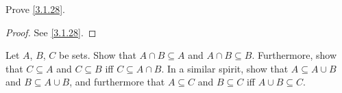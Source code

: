 \begin{ex}\label{ex:3.1.6}
	Prove \cref{3.1.28}.
\end{ex}

\begin{proof}
	See \cref{3.1.28}.
\end{proof}

\begin{ex}\label{ex:3.1.7}
	Let \(A\), \(B\), \(C\) be sets.
	Show that \(A \cap B \subseteq A\) and \(A \cap B \subseteq B\).
	Furthermore, show that \(C \subseteq A\) and \(C \subseteq B\) iff \(C \subseteq A \cap B\).
	In a similar spirit, show that \(A \subseteq A \cup B\) and \(B \subseteq A \cup B\), and furthermore that \(A \subseteq C\) and \(B \subseteq C\) iff \(A \cup B \subseteq C\).
\end{ex}

